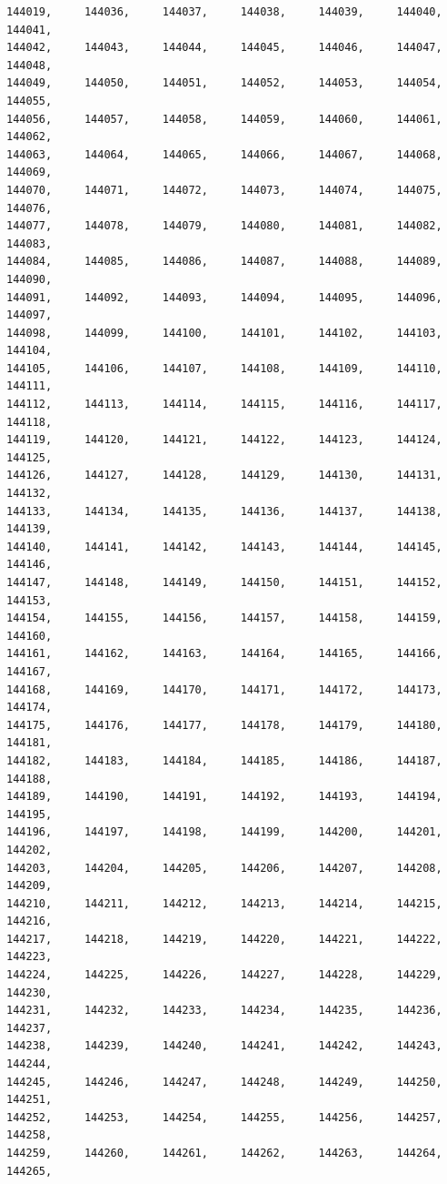 \documentclass[a4paper,11pt]{report}
\begin{document}
\begin{verbatim}
144019,     144036,     144037,     144038,     144039,     144040,     144041,
144042,     144043,     144044,     144045,     144046,     144047,     144048,
144049,     144050,     144051,     144052,     144053,     144054,     144055,
144056,     144057,     144058,     144059,     144060,     144061,     144062,
144063,     144064,     144065,     144066,     144067,     144068,     144069,
144070,     144071,     144072,     144073,     144074,     144075,     144076,
144077,     144078,     144079,     144080,     144081,     144082,     144083,
144084,     144085,     144086,     144087,     144088,     144089,     144090,
144091,     144092,     144093,     144094,     144095,     144096,     144097,
144098,     144099,     144100,     144101,     144102,     144103,     144104,
144105,     144106,     144107,     144108,     144109,     144110,     144111,
144112,     144113,     144114,     144115,     144116,     144117,     144118,
144119,     144120,     144121,     144122,     144123,     144124,     144125,
144126,     144127,     144128,     144129,     144130,     144131,     144132,
144133,     144134,     144135,     144136,     144137,     144138,     144139,
144140,     144141,     144142,     144143,     144144,     144145,     144146,
144147,     144148,     144149,     144150,     144151,     144152,     144153,
144154,     144155,     144156,     144157,     144158,     144159,     144160,
144161,     144162,     144163,     144164,     144165,     144166,     144167,
144168,     144169,     144170,     144171,     144172,     144173,     144174,
144175,     144176,     144177,     144178,     144179,     144180,     144181,
144182,     144183,     144184,     144185,     144186,     144187,     144188,
144189,     144190,     144191,     144192,     144193,     144194,     144195,
144196,     144197,     144198,     144199,     144200,     144201,     144202,
144203,     144204,     144205,     144206,     144207,     144208,     144209,
144210,     144211,     144212,     144213,     144214,     144215,     144216,
144217,     144218,     144219,     144220,     144221,     144222,     144223,
144224,     144225,     144226,     144227,     144228,     144229,     144230,
144231,     144232,     144233,     144234,     144235,     144236,     144237,
144238,     144239,     144240,     144241,     144242,     144243,     144244,
144245,     144246,     144247,     144248,     144249,     144250,     144251,
144252,     144253,     144254,     144255,     144256,     144257,     144258,
144259,     144260,     144261,     144262,     144263,     144264,     144265,

\end{verbatim}
\end{document}
